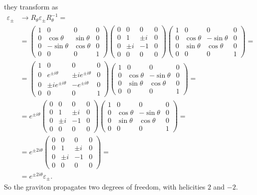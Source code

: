 \documentclass[a4paper,12pt]{book}
\renewcommand{\epsilon}{\varepsilon}
\theoremstyle{definition}
\theoremstyle{remark}
\begin{document}
they transform as
\begin{align*}
\epsilon_\pm&\to R_\theta\epsilon_\pm R^{-1}_\theta=\\
&=
\begin{pmatrix}
1 & 0 & 0 & 0\\
0 & \cos\theta & \sin\theta & 0\\
0 & -\sin\theta & \cos\theta & 0\\
0 & 0 & 0 & 1
\end{pmatrix}
\begin{pmatrix}
0 & 0 & 0 & 0\\
0 & 1 & \pm i & 0\\
0 & \pm i & -1 & 0\\
0 & 0 & 0 & 0
\end{pmatrix}
\begin{pmatrix}
1 & 0 & 0 & 0\\
0 & \cos\theta & -\sin\theta & 0\\
0 & \sin\theta & \cos\theta & 0\\
0 & 0 & 0 & 1
\end{pmatrix}=\\
&=
\begin{pmatrix}
1 & 0 & 0 & 0\\
0 & e^{\pm i\theta} & \pm ie^{\pm i\theta} & 0\\
0 & \pm ie^{\pm i\theta} & -e^{\pm i\theta} & 0\\
0 & 0 & 0 & 1
\end{pmatrix}
\begin{pmatrix}
1 & 0 & 0 & 0\\
0 & \cos\theta & -\sin\theta & 0\\
0 & \sin\theta & \cos\theta & 0\\
0 & 0 & 0 & 1
\end{pmatrix}=\\
&=e^{\pm i\theta}
\begin{pmatrix}
0 & 0 & 0 & 0\\
0 & 1 & \pm i & 0\\
0 & \pm i & -1 & 0\\
0 & 0 & 0 & 0
\end{pmatrix}
\begin{pmatrix}
1 & 0 & 0 & 0\\
0 & \cos\theta & -\sin\theta & 0\\
0 & \sin\theta & \cos\theta & 0\\
0 & 0 & 0 & 1
\end{pmatrix}=\\
&=e^{\pm 2i\theta}
\begin{pmatrix}
0 & 0 & 0 & 0\\
0 & 1 & \pm i & 0\\
0 & \pm i & -1 & 0\\
0 & 0 & 0 & 0
\end{pmatrix}=\\
&=e^{\pm 2i\theta}\epsilon_\pm.
\end{align*}
So the graviton propagates two degrees of freedom, with helicities $2$ and $-2$.
\end{document}
